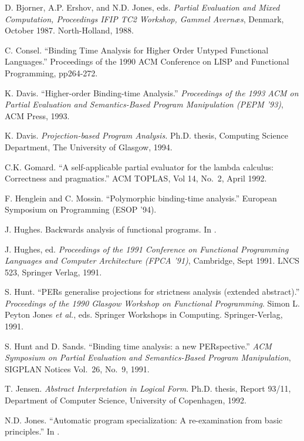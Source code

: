 \begin{article}
\begin{thebibliography}{123456}
D. Bjorner, A.P. Ershov, and N.D. Jones, eds.
{\it Partial Evaluation and Mixed Computation,
Proceedings IFIP TC2 Workshop, Gammel Avern{\ae}s}, Denmark, October 1987.
North-Holland, 1988.

C. Consel. 
``Binding Time Analysis for Higher Order Untyped Functional Languages.''
Proceedings of the 1990 ACM Conference on LISP and 
Functional Programming, pp264-272.

K. Davis.
``Higher-order Binding-time Analysis.'' 
{\it Proceedings of the 1993 ACM on Partial Evaluation and
Semantics-Based Program Manipulation (PEPM '93)},
ACM Press, 1993.

K. Davis.
{\it Projection-based Program Analysis.}
Ph.D. thesis, Computing Science Department,
The University of Glasgow, 1994.

C.K. Gomard.
``A self-applicable partial evaluator for the lambda calculus:  Correctness
and pragmatics.''
ACM TOPLAS, Vol 14, No.\ 2, April 1992.

F. Henglein and C. Mossin.
``Polymorphic binding-time analysis.''
European Symposium on Programming (ESOP '94).

J. Hughes.
Backwards analysis of functional programs.
In \cite{BEJ88}.

J. Hughes, ed.
{\it Proceedings of the 1991 Conference on Functional Programming Languages
and Computer Architecture (FPCA '91)}, Cambridge, Sept 1991. LNCS 523,
Springer Verlag, 1991.

S. Hunt.
``PERs generalise projections for strictness analysis (extended abstract).''
{\it Proceedings of the 1990 Glasgow Workshop
on Functional Programming}.
Simon L. Peyton Jones {\it et al.}, eds.
Springer Workshops in Computing.
Springer-Verlag, 1991.

S. Hunt and D. Sands.
``Binding time analysis:  a new PERspective.''
{\it ACM Symposium on Partial Evaluation
and Semantics-Based Program Manipulation},
SIGPLAN Notices Vol.\ 26, No.\ 9, 1991.

T. Jensen.
{\it Abstract Interpretation in Logical Form}.
Ph.D. thesis, Report 93/11, Department of Computer Science,
University of Copenhagen, 1992.

N.D. Jones.
``Automatic program specialization: A re-examination from
basic principles.'' In \cite{BEJ88}.


\end{thebibliography}
\end{article}
